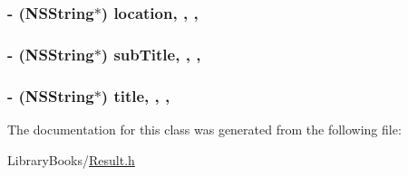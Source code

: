 \subsubsection[{location}]{\setlength{\rightskip}{0pt plus 5cm}-\/ (N\+S\+String$\ast$) location\hspace{0.3cm}{\ttfamily [read]}, {\ttfamily [write]}, {\ttfamily [nonatomic]}, {\ttfamily [strong]}}\label{interface_result_af3b3c099477d3b115685206a8431aae2}
\hypertarget{interface_result_a4762f86f65f843c100a26838b8b901d4}{}
\subsubsection[{sub\+Title}]{\setlength{\rightskip}{0pt plus 5cm}-\/ (N\+S\+String$\ast$) sub\+Title\hspace{0.3cm}{\ttfamily [read]}, {\ttfamily [write]}, {\ttfamily [nonatomic]}, {\ttfamily [strong]}}\label{interface_result_a4762f86f65f843c100a26838b8b901d4}
\hypertarget{interface_result_a221a82d22ef456d6a35cf6d74802b262}{}
\subsubsection[{title}]{\setlength{\rightskip}{0pt plus 5cm}-\/ (N\+S\+String$\ast$) title\hspace{0.3cm}{\ttfamily [read]}, {\ttfamily [write]}, {\ttfamily [nonatomic]}, {\ttfamily [strong]}}\label{interface_result_a221a82d22ef456d6a35cf6d74802b262}


The documentation for this class was generated from the following file\+:\begin{DoxyCompactItemize}
\item 
Library\+Books/\hyperlink{_result_8h}{Result.\+h}\end{DoxyCompactItemize}
